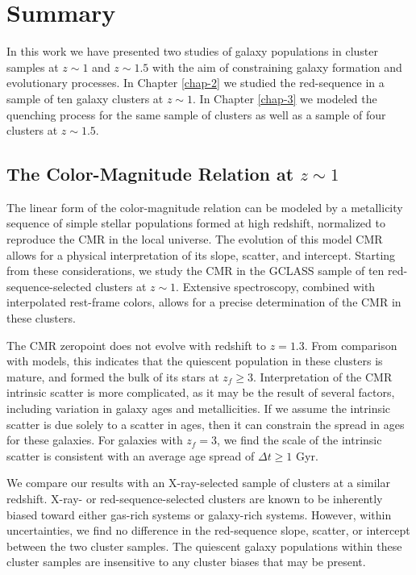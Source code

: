 \chapter{Summary}

In this work we have presented two studies of galaxy populations in cluster samples at $z\sim1$ and $z\sim1.5$ with the aim of constraining galaxy formation and evolutionary processes.
In Chapter \ref{chap-2} we studied the red-sequence in a sample of ten galaxy clusters at $z\sim1$.
In Chapter \ref{chap-3} we modeled the quenching process for the same sample of clusters as well as a sample of four clusters at $z\sim1.5$.

\section{The Color-Magnitude Relation at $z\sim1$}

The linear form of the color-magnitude relation can be modeled by a metallicity sequence of simple stellar populations formed at high redshift, normalized to reproduce the CMR in the local universe.
The evolution of this model CMR allows for a physical interpretation of its slope, scatter, and intercept.
Starting from these considerations, we study the CMR in the GCLASS sample of ten red-sequence-selected clusters at $z\sim1$.
Extensive spectroscopy, combined with interpolated rest-frame colors, allows for a precise determination of the CMR in these clusters.

The CMR zeropoint does not evolve with redshift to $z=1.3$.
From comparison with models, this indicates that the quiescent population in these clusters is mature, and formed the bulk of its stars at $z_f \geq 3$.
Interpretation of the CMR intrinsic scatter is more complicated, as it may be the result of several factors, including variation in galaxy ages and metallicities.
If we assume the intrinsic scatter is due solely to a scatter in ages, then it can constrain the spread in ages for these galaxies.
For galaxies with $z_f=3$, we find the scale of the intrinsic scatter is consistent with an average age spread of $\Delta t \geq 1$ Gyr.


We compare our results with an X-ray-selected sample of clusters at a similar redshift.
X-ray- or red-sequence-selected clusters are known to be inherently biased toward either gas-rich systems or galaxy-rich systems.
However, within uncertainties, we find no difference in the red-sequence slope, scatter, or intercept between the two cluster samples.
The quiescent galaxy populations within these cluster samples are insensitive to any cluster biases that may be present.

